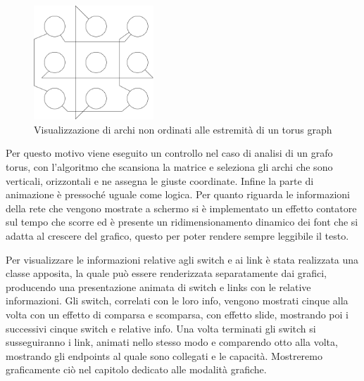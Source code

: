 \documentclass[binding=0.6cm]{sapthesis}
\begin{document}
\begin{figure}[h]
    \centering
    \includegraphics[width=0.4\textwidth]{immagini/archi_asimmetrici_torus.png}
    \caption{Visualizzazione di archi non ordinati alle estremità di un torus graph}
    \label{fig:torus_archi_asimmetrici}
\end{figure}

Per questo motivo viene eseguito un controllo nel caso di analisi di un grafo torus, con l'algoritmo che scansiona la matrice e seleziona gli 
archi che sono verticali, orizzontali
e ne assegna le giuste coordinate.
Infine la parte di animazione è pressoché uguale come logica.
Per quanto riguarda le informazioni della rete che vengono mostrate a schermo si è implementato un effetto contatore sul tempo che scorre ed è presente
un ridimensionamento dinamico dei font che si adatta al crescere del grafico, questo per poter rendere sempre leggibile il testo.


Per visualizzare le informazioni relative agli switch e ai link è stata realizzata una classe apposita, la quale può essere renderizzata separatamente dai grafici, producendo una presentazione animata di switch e links con le relative informazioni.
Gli switch, correlati con le loro info, vengono mostrati cinque alla volta con un effetto di comparsa e scomparsa, con effetto slide, mostrando poi i successivi cinque switch e relative info.
Una volta terminati gli switch si susseguiranno i link, animati nello stesso modo e comparendo otto alla volta, mostrando gli endpoints al quale sono collegati e le capacità. Mostreremo graficamente ciò nel capitolo dedicato alle modalità grafiche.
\end{document}
